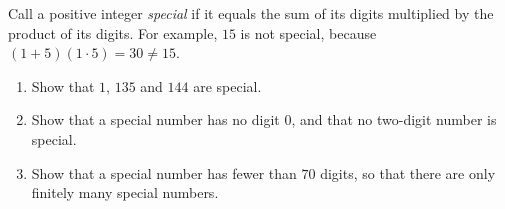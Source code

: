 Call a positive integer \emph{special} if it equals the sum of its digits multiplied by the product of its digits. For example, $15$ is not special, because $(1+5)(1\cdot5)=30\ne15$.
\begin{enumerate}
\item[(a)] Show that $1$, $135$ and $144$ are special.
\item[(b)] Show that a special number has no digit $0$, and that no two-digit number is special.
\item[(c)] Show that a special number has fewer than $70$ digits, so that there are only finitely many special numbers.
\end{enumerate}
